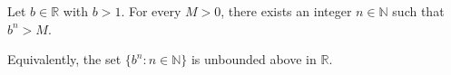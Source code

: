\begin{corollary} \label{corollary:integer_powers_of_real_number_greater_than_1_are_unbounded}
    Let $b \in \mathbb{R}$ with $b > 1$. For every $M > 0$, there exists an integer $n \in \mathbb{N}$ such that $b^n > M$.

    Equivalently, the set $\{ b^n : n \in \mathbb{N} \}$ is unbounded above in $\mathbb{R}$.
\end{corollary}

